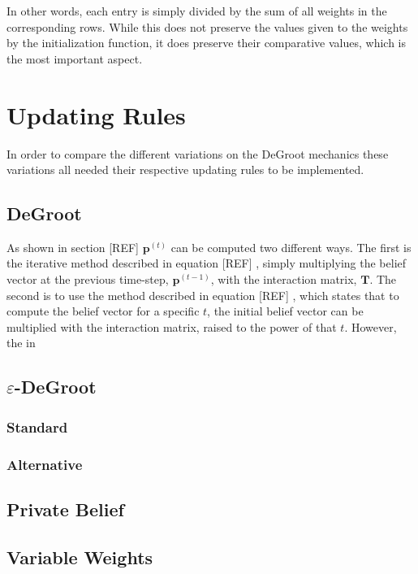 \documentclass{article}
\newcommand{\T}{\textbf{T}}
\begin{document}
In other words, each entry is simply divided by the sum of all weights in the corresponding rows. While this does not preserve the values given to the weights by the initialization function, it does preserve their comparative values, which is the most important aspect.



\section{Updating Rules}

In order to compare the different variations on the DeGroot mechanics these variations all needed their respective updating rules to be implemented.

\subsection{DeGroot}

As shown in section [REF] $\textbf{p}^{(t)}$ can be computed two different ways. The first is the iterative method described in equation [REF] , simply multiplying the belief vector at the previous time-step, $\textbf{p}^{(t-1)}$, with the interaction matrix, $\T$.
The second is to use the method described in equation [REF] , which states that to compute the belief vector for a specific $t$, the initial belief vector can be multiplied with the interaction matrix, raised to the power of that $t$. However, the in

\subsection{$\varepsilon$-DeGroot}
\subsubsection{Standard}
\subsubsection{Alternative}

\subsection{Private Belief}

\subsection{Variable Weights}
\end{document}
